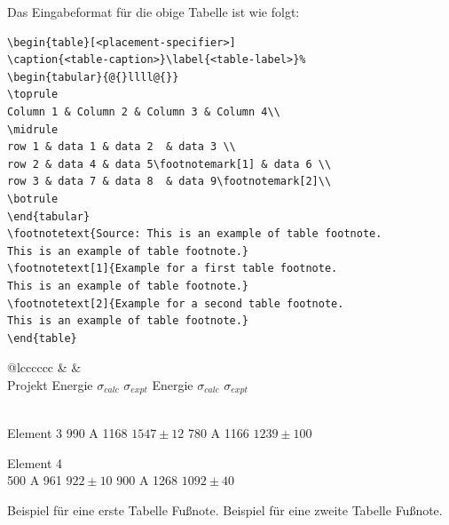 \documentclass[pdflatex,sn-mathphys-num]{sn-jnl}%
\theoremstyle{thmstyleone}%
\theoremstyle{thmstyletwo}%
\theoremstyle{thmstylethree}%
\begin{document}
\noindent Das Eingabeformat für die obige Tabelle ist wie folgt:

\bigskip\begin{verbatim}
\begin{table}[<placement-specifier>]
\caption{<table-caption>}\label{<table-label>}%
\begin{tabular}{@{}llll@{}}
\toprule
Column 1 & Column 2 & Column 3 & Column 4\\
\midrule
row 1 & data 1 & data 2	 & data 3 \\
row 2 & data 4 & data 5\footnotemark[1] & data 6 \\
row 3 & data 7 & data 8	 & data 9\footnotemark[2]\\
\botrule
\end{tabular}
\footnotetext{Source: This is an example of table footnote. 
This is an example of table footnote.}
\footnotetext[1]{Example for a first table footnote.
This is an example of table footnote.}
\footnotetext[2]{Example for a second table footnote. 
This is an example of table footnote.}
\end{table}
\end{verbatim}
\bigskip%

\begin{table}[h]
\caption{Beispiel für eine lange Tabelle, die auf die volle Textbreite eingestellt ist}\label{tab2}
\begin{tabular*}{\textwidth}{@{\extracolsep\fill}lcccccc}
\toprule%
&  &  \\%
Projekt Energie $\sigma_{calc}$ $\sigma_{expt}$ Energie $\sigma_{calc}$ $\sigma_{expt}$

\\{\midrule} Element 3 990 A 1168 $1547\pm12$ 780 A 1166 $1239\pm100$

Element 4 \\{500 A} 961 $922\pm10$ 900 A 1268 $1092\pm40$

\botrule
\end{tabular*}
 {\footnotetext[1]Beispiel für eine erste Tabelle Fußnote}. {\footnotetext[2]Beispiel für eine zweite Tabelle Fußnote}.
\end{table}
\end{document}
